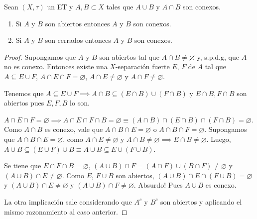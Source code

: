 \documentclass{article}
\theoremstyle{definition}
\newenvironment{ejercicio}[1]{\begin{trivlist}
\item[\hskip \labelsep {\bfseries Ejercicio}\hskip \labelsep {\bfseries #1.}]}{\end{trivlist}}
\begin{document}

\clearpage

\begin{ejercicio}{6}
    Sean \((X, \tau)\) un ET y \(A, B \subset X\) tales que \(A \cup B\) y \(A \cap B\) son conexos.
    \begin{enumerate}
        \item Si \( A \) y \( B \) son abiertos entonces  \( A \) y \( B \) son conexos.
        \item Si \( A \) y \( B \) son cerrados entonces \( A \) y \( B \) son conexos.
    \end{enumerate}
\end{ejercicio}
\begin{proof}
    Supongamos que \( A \) y \( B \) son abiertos tal que \( A \cap B \neq \varnothing \) y, s.p.d.g, que \( A \) no es conexo.
    Entonces existe una \( X \)-separación fuerte \( E \), \( F \) de \( A \) tal que
    \( A \subseteq E \cup F \), \( A \cap E \cap F = \varnothing \), \( A \cap E \neq \varnothing \) y
    \( A \cap F \neq \varnothing \).

    Tenemos que \( A \subseteq E \cup F \implies A \cap B \subseteq (E \cap B) \cup (F \cap B) \) y \( E \cap B, F \cap B \) son abiertos pues \( E, F, B \) lo son.

    \( A \cap E \cap F = \varnothing \implies A \cap E \cap F \cap B = \varnothing \equiv (A \cap B) \cap (E \cap B) \cap (F \cap B) = \varnothing \). Como \( A \cap B \) es conexo, vale que
    \( A \cap B \cap E = \varnothing \) o \( A \cap B \cap F = \varnothing \). Supongamos que \( A \cap B \cap E = \varnothing \), como \( A \cap E \neq \varnothing \)
    y \( A \cap B \neq \varnothing \implies E \cap B \neq \varnothing \). Luego, \( A \cup B \subseteq (E \cup F) \cup B \equiv A \cup B \subseteq E \cup (F \cup B) \).

    Se tiene que \( E \cap F \cap B = \varnothing \), \( ( A \cup B ) \cap F = (A \cap F) \cup (B \cap F) \neq \varnothing \) y \( (A \cup B) \cap E \neq \varnothing \). Como \( E \), \( F \cup B \) son abiertos,
    \( (A \cup B) \cap E \cap (F \cup B) = \varnothing \) y \( (A \cup B) \cap E \neq \varnothing \) y \( (A \cup B) \cap F \neq \varnothing \). Absurdo! Pues \( A \cup B \) es conexo.

    La otra implicación sale considerando que \( A^c \) y \( B^c \) son abiertos y aplicando el mismo razonamiento al caso anterior.
\end{proof}
\end{document}
